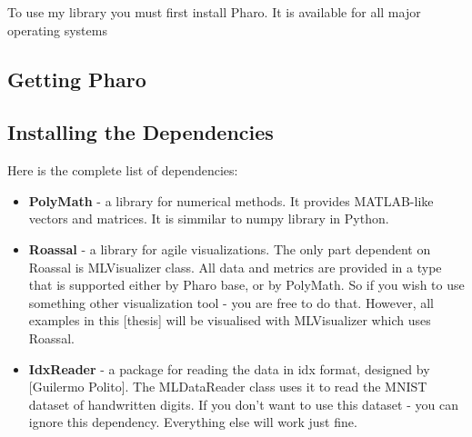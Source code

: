 To use my library you must first install Pharo. It is available for all major operating systems

\subsection{Getting Pharo}

\subsection{Installing the Dependencies}
Here is the complete list of dependencies:
\begin{itemize}
  \item \textbf{PolyMath} - a library for numerical methods. It provides MATLAB-like vectors and matrices. It is simmilar to numpy library in Python.
  \item \textbf{Roassal} - a library for agile visualizations. The only part dependent on Roassal is MLVisualizer class. All data and metrics are provided in a type that is supported either by Pharo base, or by PolyMath. So if you wish to use something other visualization tool - you are free to do that. However, all examples in this [thesis] will be visualised with MLVisualizer which uses Roassal.
  \item \textbf{IdxReader} - a package for reading the data in idx format, designed by [Guilermo Polito]. The MLDataReader class uses it to read the MNIST dataset of handwritten digits. If you don't want to use this dataset - you can ignore this dependency. Everything else will work just fine.
\end{itemize}
